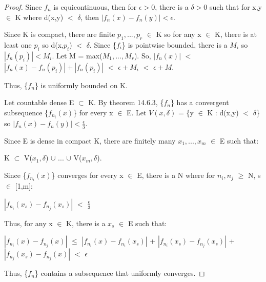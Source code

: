     \begin{proof}
        Since $f_n$ is equicontinuous, then for $\epsilon > 0$, there is a
        $\delta > 0$ such that for x,y $\in$ K where d(x,y) $<$ $\delta$, then
        $|f_n(x) - f_n(y)| < \epsilon$.

        Since K is compact, there are finite $p_1,...,p_r$ $\in$ K so for
        any x $\in$ K, there is at least one $p_i$ so d(x,$p_i$) $<$ $\delta$.
        Since \{$f_i$\} is pointwise bounded, there is a $M_i$ so
        $|f_n(p_i)| < M_i$. Let M = max($M_1,...,M_r$).
        So, $|f_n(x)|$ $<$ $|f_n(x) - f_n(p_i)| + |f_n(p_i)|$
        $<$ $\epsilon + M_i$ $<$ $\epsilon + M$.

        Thus, \{$f_n$\} is uniformly bounded on K.

        \vspace{0.3cm}

        Let countable dense E $\subset$ K.
        By {\color{red} theorem 14.6.3}, \{$f_n$\} has a convergent subsequence
        \{$f_{n_i}(x)$\} for every x $\in$ E.
        Let $V(x,\delta)$ = \{y $\in$ K : d(x,y) $<$ $\delta$\}
        so $|f_n(x) - f_n(y)| < \frac{\epsilon}{3}$.

        Since E is dense in compact K, there are finitely many $x_1,...,x_m$ $\in$
        E such that:
        
        \hspace{0.5cm}
        K $\subset$ V($x_1,\delta$) $\cup$ ... $\cup$ V($x_m,\delta$).

        Since \{$f_{n_i}(x)$\} converges for every x $\in$ E,
        there is a N where for $n_i,n_j$ $\geq$ N, s $\in$ [1,m]:

        \hspace{0.5cm}
        $|f_{n_i}(x_s) - f_{n_j}(x_s)|$ $<$ $\frac{\epsilon}{3}$

        Thus, for any x $\in$ K, there is a $x_s$ $\in$ E such that:

        \hspace{0.5cm}
        $|f_{n_i}(x) - f_{n_j}(x)|$
        $\leq$ $|f_{n_i}(x) - f_{n_i}(x_s)|$ + $|f_{n_i}(x_s) - f_{n_j}(x_s)|$
                + $|f_{n_j}(x_s) - f_{n_j}(x)|$
        $<$ $\epsilon$

        Thus, \{$f_n$\} contains a subsequence that uniformly converges.
    \end{proof}

    \newpage





